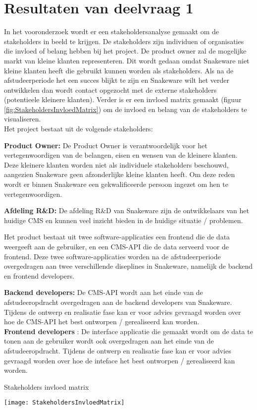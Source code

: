 \section{Resultaten van deelvraag 1}
In het vooronderzoek wordt er een stakeholdersanalyse gemaakt om de stakeholders in beeld te krijgen.
De stakeholders zijn individuen of organisaties die invloed of belang hebben bij het project.
De product owner zal de mogelijke markt van kleine klanten representeren.
Dit wordt gedaan omdat Snakeware niet kleine klanten heeft die gebruikt kunnen worden als stakeholders.
Als na de afstudeerperiode het een succes blijkt te zijn en Snakeware wilt het verder ontwikkelen dan wordt contact opgezocht met de externe stakeholders (potentieele kleinere klanten). 
Verder is er een invloed matrix gemaakt (figuur \ref{fig:StakeholdersInvloedMatrix}) om de invloed en belang van de stakeholders te visualiseren. \\
Het project bestaat uit de volgende stakeholders:

\whitespace
\textbf{Product Owner:}
De Product Owner is verantwoordelijk voor het vertegenwoordigen van de belangen, eisen en wensen van de kleinere klanten.
Deze kleinere klanten worden niet als individuele stakeholders beschouwd, aangezien Snakeware geen afzonderlijke kleine klanten heeft.
Om deze reden wordt er binnen Snakeware een gekwalificeerde persoon ingezet om hen te vertegenwoordigen.

\whitespace
\textbf{Afdeling R\&D:} De afdeling R\&D van Snakeware zijn de ontwikkelaars van het huidige \gls{CMS} en kunnen veel inzicht bieden in de huidige situatie / problemen.

\whitespace
Het product bestaat uit twee software-applicaties een frontend die de data weergeeft aan de gebruiker, en een \gls{CMS}-API die de data serveerd voor de frontend.
Deze twee software-applicaties worden na de afstudeerperiode overgedragen aan twee verschillende diseplines in Snakeware, namelijk de backend en frontend developers.

\whitespace
\textbf{Backend developers:} De \gls{CMS}-API wordt aan het einde van de afstudeeropdracht overgedragen aan de backend developers van Snakeware.
Tijdens de ontwerp en realisatie fase kan er voor advies gevraagd worden over hoe de \gls{CMS}-API het best ontworpen / gerealiseerd kan worden. \\
\textbf{Frontend developers} : De interface applicatie die gemaakt wordt om de data te tonen aan de gebruiker wordt ook overgedragen aan het einde van de afstudeeropdracht.
Tijdens de ontwerp en realisatie fase kan er voor advies gevraagd worden over hoe de inteface het best ontworpen / gerealiseerd kan worden.

\whitespace
\begin{graphic}
    \captionsetup{type=figure}
    \caption{Stakeholders invloed matrix}
    \texttt{[image: StakeholdersInvloedMatrix]}
    \label{fig:StakeholdersInvloedMatrix}
\end{graphic}
